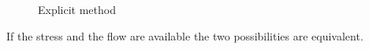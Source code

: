 \documentclass[11pt]{article}
\begin{document}
\begin{figure}[H]
\centering
{}
\caption{Explicit method}
\label{fig:multiscaleBC}
\end{figure}

If the stress and the flow are available the two possibilities are equivalent.
\end{document}
